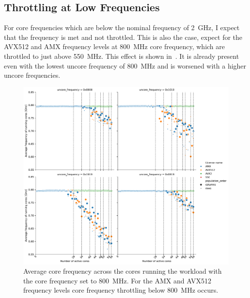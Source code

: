 \subsection{Throttling at Low Frequencies}
\label{sec:avx-anomalies-low-freq}

For core frequencies which are below the nominal frequency of \SI{2}{\GHz}, I expect that the frequency is met and not throttled.
This is also the case, expect for the AVX512 and AMX frequency levels at \SI{800}{\MHz} core frequency, which are throttled to just above \SI{550}{\MHz}.
This effect is shown in~.
It is already present even with the lowest uncore frequency of \SI{800}{\MHz} and is worsened with a higher uncore frequencies.

\begin{figure}[]
    \centering
    \includegraphics[width=0.8\columnwidth]{fig/avx-frequency-license-bands-without-isst-core-frequency-800.pdf}
    \caption{\label{fig:avx-anomalies-low-freq}Average core frequency across the cores running the workload with the core frequency set to \SI{800}{\MHz}. For the AMX and AVX512 frequency levels core frequency throttling below \SI{800}{\MHz} occurs.}
\end{figure}

